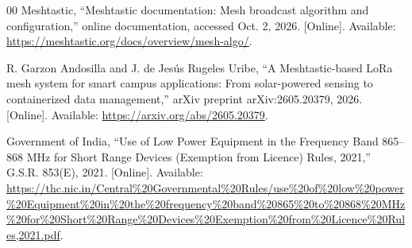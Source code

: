 \documentclass[journal]{IEEEtran}
\begin{document}
\begin{thebibliography}{00}
Meshtastic, ``Meshtastic documentation: Mesh broadcast algorithm and
  configuration,'' online documentation, accessed Oct. 2, 2026. [Online].
  Available: \url{https://meshtastic.org/docs/overview/mesh-algo/}.

R. Garzon Andosilla and J. de Jes\'us Rugeles Uribe, ``A Meshtastic-based
  LoRa mesh system for smart campus applications: From solar-powered
  sensing to containerized data management,'' arXiv preprint
  arXiv:2605.20379, 2026. [Online]. Available:
  \url{https://arxiv.org/abs/2605.20379}.

Government of India, ``Use of Low Power Equipment in the Frequency Band
  865--868 MHz for Short Range Devices (Exemption from Licence) Rules, 2021,''
  G.S.R. 853(E), 2021. [Online]. Available:
  \url{https://thc.nic.in/Central\%20Governmental\%20Rules/use\%20of\%20low\%20power\%20Equipment\%20in\%20the\%20frequency\%20band\%20865\%20to\%20868\%20MHz\%20for\%20Short\%20Range\%20Devices\%20Exemption\%20from\%20Licence\%20Rules,2021.pdf}.

\end{thebibliography}
\end{document}
